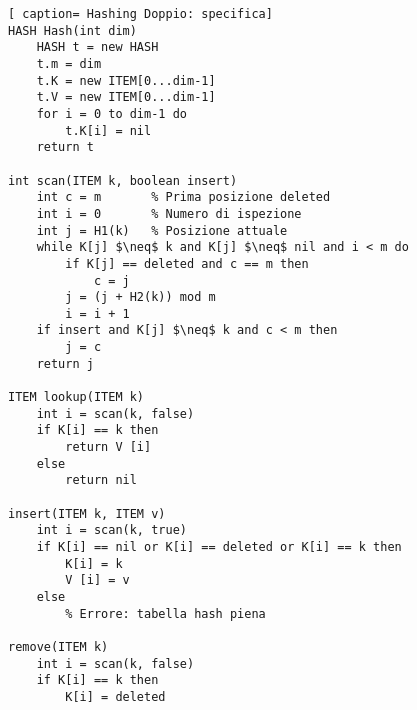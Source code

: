\documentclass[../cheatSheetAlgoritmi.tex]{subfiles}
\begin{document}
\begin{lstlisting}[ caption= Hashing Doppio: specifica]
HASH Hash(int dim)
	HASH t = new HASH
	t.m = dim
	t.K = new ITEM[0...dim-1]
	t.V = new ITEM[0...dim-1]
	for i = 0 to dim-1 do
		t.K[i] = nil
	return t
	
int scan(ITEM k, boolean insert)
	int c = m		% Prima posizione deleted
	int i = 0		% Numero di ispezione
	int j = H1(k)	% Posizione attuale
	while K[j] $\neq$ k and K[j] $\neq$ nil and i < m do
		if K[j] == deleted and c == m then
			c = j
		j = (j + H2(k)) mod m
		i = i + 1
	if insert and K[j] $\neq$ k and c < m then
		j = c
	return j	
	
ITEM lookup(ITEM k)
	int i = scan(k, false)
	if K[i] == k then
		return V [i]
	else
		return nil
		
insert(ITEM k, ITEM v)
	int i = scan(k, true)
	if K[i] == nil or K[i] == deleted or K[i] == k then
		K[i] = k
		V [i] = v
	else
		% Errore: tabella hash piena
		
remove(ITEM k)
	int i = scan(k, false)
	if K[i] == k then
		K[i] = deleted
\end{lstlisting}

 
\end{document}
